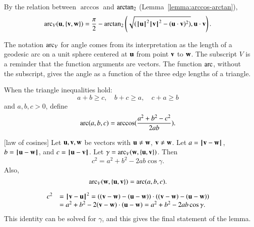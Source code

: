 By the relation between $\arccos$ and $\atn$
(Lemma~\ref{lemma:arccos-arctan}), %
    \begin{equation}\label{eqn:angle}
    \arc_V(\u,\{\v,\w\}) = \frac{\pi}2 - \atn\left ({\sqrt{(\normo{\u}^2\normo{\v}^2 -
    (\u\cdot \v)^2)}}, {\u\cdot \v}\right).
    \end{equation}
%

The notation $\arc_V$ for angle comes from its interpretation as the
length of a geodesic arc on a unit sphere
centered at $\u$ from point $\v$ to $\w$.
%
The subscript $V$ is a reminder that
the function arguments are vectors.  The function
$\arc$, without the subscript,  gives the angle as a function
of the three edge lengths of a triangle.
%
%
%


\begin{definition}[arc]
When the triangle inequalities hold:
$$
a + b \ge c,\quad b + c \ge a, \quad c+a \ge b
$$
and $a,b,c >0$, define
 $$\arc(a,b,c) = \arccos(\frac{a^2 + b^2 - c^2}{2 a b}).$$
%
\end{definition}

\begin{lemma}[law of cosines]
Let $\u,\v,\w$ be vectors with $\u\ne \w$, $\v\ne \w$.  Let $a
    = \norm{\v }{ \w}$, $b = \norm{\u }{ \w}$, and $c = \norm{\u }{ \v}$.
    Let $\gamma=\arc_V(\w,\{\u,\v\})$.    Then
        $$c^2 = a^2 + b^2 - 2 a b \cos\gamma.$$
Also,
$$
\arc_V(\w,\{\u,\v\})= \arc(a,b,c).
$$

\end{lemma}
%
%
%
%
\begin{proved}
    $$\begin{array}{lll}c^2 &= \norm{\v }{ \u}^2 = ((\v - \w) - (\u - \w))\cdot ((\v - \w) - (\u -
    \w)) \\ &= a^2 + b^2 - 2 (\v - \w)\cdot (\u - \w) = a^2 +b ^2 - 2 a b
    \cos\gamma.
    \end{array}$$
This identity can be solved for $\gamma$, and this gives the final statement of the lemma.
\swallowed\end{proved}


